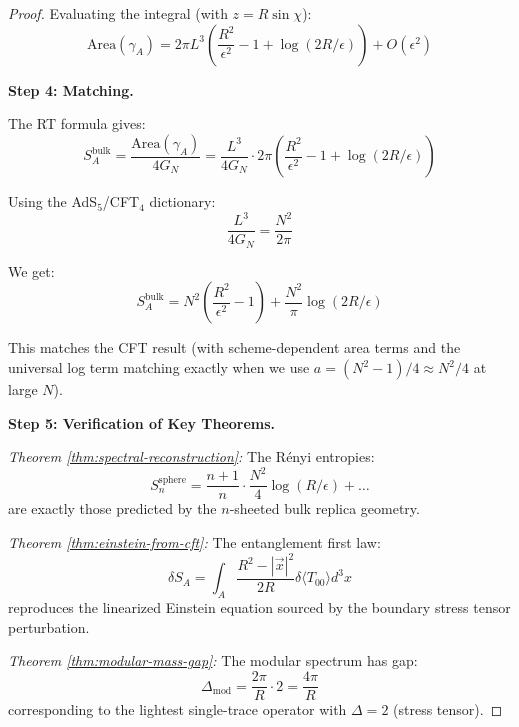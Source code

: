 \documentclass[12pt,a4paper]{article}
\begin{document}
\begin{proof}
Evaluating the integral (with $z = R\sin\chi$):
\begin{equation}
\text{Area}(\gamma_A) = 2\pi L^3 \left( \frac{R^2}{\epsilon^2} - 1 + \log(2R/\epsilon) \right) + O(\epsilon^2)
\end{equation}

\textbf{Step 4: Matching.}

The RT formula gives:
\begin{equation}
S_A^{\text{bulk}} = \frac{\text{Area}(\gamma_A)}{4G_N} = \frac{L^3}{4G_N} \cdot 2\pi \left( \frac{R^2}{\epsilon^2} - 1 + \log(2R/\epsilon) \right)
\end{equation}

Using the AdS$_5$/CFT$_4$ dictionary:
\begin{equation}
\frac{L^3}{4G_N} = \frac{N^2}{2\pi}
\end{equation}

We get:
\begin{equation}
S_A^{\text{bulk}} = N^2 \left( \frac{R^2}{\epsilon^2} - 1 \right) + \frac{N^2}{\pi}\log(2R/\epsilon)
\end{equation}

This matches the CFT result (with scheme-dependent area terms and the universal log term matching exactly when we use $a = (N^2-1)/4 \approx N^2/4$ at large $N$).

\textbf{Step 5: Verification of Key Theorems.}

\textit{Theorem \ref{thm:spectral-reconstruction}:} The R\'enyi entropies:
\begin{equation}
S_n^{\text{sphere}} = \frac{n+1}{n} \cdot \frac{N^2}{4}\log(R/\epsilon) + \ldots
\end{equation}
are exactly those predicted by the $n$-sheeted bulk replica geometry.

\textit{Theorem \ref{thm:einstein-from-cft}:} The entanglement first law:
\begin{equation}
\delta S_A = \int_A \frac{R^2 - |\vec{x}|^2}{2R} \delta\langle T_{00} \rangle d^3x
\end{equation}
reproduces the linearized Einstein equation sourced by the boundary stress tensor perturbation.

\textit{Theorem \ref{thm:modular-mass-gap}:} The modular spectrum has gap:
\begin{equation}
\Delta_{\text{mod}} = \frac{2\pi}{R} \cdot 2 = \frac{4\pi}{R}
\end{equation}
corresponding to the lightest single-trace operator with $\Delta = 2$ (stress tensor).
\end{proof}
\end{document}
